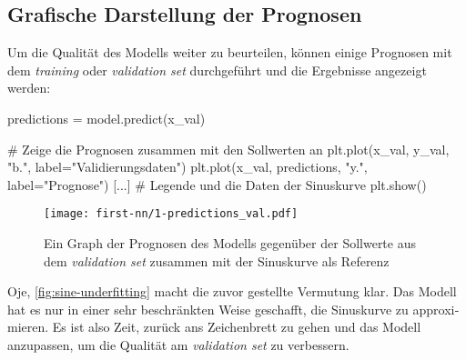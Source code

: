 \subsection{Grafische Darstellung der Prognosen}
Um die Qualität des Modells weiter zu beurteilen, können einige
Prognosen mit dem \textit{training} oder \textit{validation set}
durchgeführt und die Ergebnisse angezeigt werden:
\begin{pythoncode}
predictions = model.predict(x_val)

# Zeige die Prognosen zusammen mit den Sollwerten an
plt.plot(x_val, y_val, "b.", label="Validierungsdaten")
plt.plot(x_val, predictions, "y.", label="Prognose")
[...] # Legende und die Daten der Sinuskurve
plt.show()
\end{pythoncode}
\begin{figure}[h!]
  \centering
  \texttt{[image: first-nn/1-predictions\_val.pdf]}
  \caption{Ein Graph der Prognosen des Modells gegenüber der Sollwerte aus dem
  \textit{validation set} zusammen mit der Sinuskurve als Referenz}
  \label{fig:sine-underfitting}
\end{figure}
Oje, \autoref{fig:sine-underfitting} macht die zuvor gestellte Vermutung klar.
Das Modell hat es nur in einer sehr beschränkten Weise
geschafft, die Sinuskurve zu ap­pro­xi­mie­ren.
Es ist also Zeit, zurück ans Zeichenbrett zu gehen und
das Modell anzupassen, um die Qualität am \textit{validation set}
zu verbessern.

